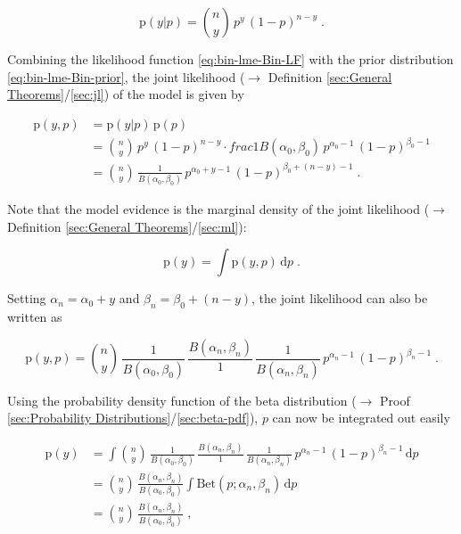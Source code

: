 \documentclass[a4paper,12pt,twoside]{book}
\begin{document}
\begin{equation} \label{eq:bin-lme-Bin-LF}
\mathrm{p}(y|p) = {n \choose y} \, p^y \, (1-p)^{n-y} \; .
\end{equation}

Combining the likelihood function \eqref{eq:bin-lme-Bin-LF} with the prior distribution \eqref{eq:bin-lme-Bin-prior}, the joint likelihood ($\rightarrow$ Definition \ref{sec:General Theorems}/\ref{sec:jl}) of the model is given by

\begin{equation} \label{eq:bin-lme-Bin-JL-s1}
\begin{split}
\mathrm{p}(y,p) &= \mathrm{p}(y|p) \, \mathrm{p}(p) \\
&= {n \choose y} \, p^y \, (1-p)^{n-y} \cdot frac{1}{B(\alpha_0,\beta_0)} \, p^{\alpha_0-1} \, (1-p)^{\beta_0-1} \\
&= {n \choose y} \, \frac{1}{B(\alpha_0,\beta_0)} \, p^{\alpha_0+y-1} \, (1-p)^{\beta_0+(n-y)-1} \; .
\end{split}
\end{equation}

Note that the model evidence is the marginal density of the joint likelihood ($\rightarrow$ Definition \ref{sec:General Theorems}/\ref{sec:ml}):

\begin{equation} \label{eq:bin-lme-Bin-ME-s1}
\mathrm{p}(y) = \int \mathrm{p}(y,p) \, \mathrm{d}p \; .
\end{equation}

Setting $\alpha_n = \alpha_0 + y$ and $\beta_n = \beta_0 + (n-y)$, the joint likelihood can also be written as

\begin{equation} \label{eq:bin-lme-Bin-JL-s2}
\mathrm{p}(y,p) = {n \choose y} \, \frac{1}{B(\alpha_0,\beta_0)} \, \frac{B(\alpha_n,\beta_n)}{1} \, \frac{1}{B(\alpha_n,\beta_n)} \, p^{\alpha_n-1} \, (1-p)^{\beta_n-1} \; .
\end{equation}

Using the probability density function of the beta distribution ($\rightarrow$ Proof \ref{sec:Probability Distributions}/\ref{sec:beta-pdf}), $p$ can now be integrated out easily

\begin{equation} \label{eq:bin-lme-Bin-ME-s2}
\begin{split}
\mathrm{p}(y) &= \int {n \choose y} \, \frac{1}{B(\alpha_0,\beta_0)} \, \frac{B(\alpha_n,\beta_n)}{1} \, \frac{1}{B(\alpha_n,\beta_n)} \, p^{\alpha_n-1} \, (1-p)^{\beta_n-1} \, \mathrm{d}p \\
&= {n \choose y} \, \frac{B(\alpha_n,\beta_n)}{B(\alpha_0,\beta_0)} \int \mathrm{Bet}(p; \alpha_n, \beta_n) \, \mathrm{d}p \\
&= {n \choose y} \, \frac{B(\alpha_n,\beta_n)}{B(\alpha_0,\beta_0)} \; ,
\end{split}
\end{equation}
\end{document}
